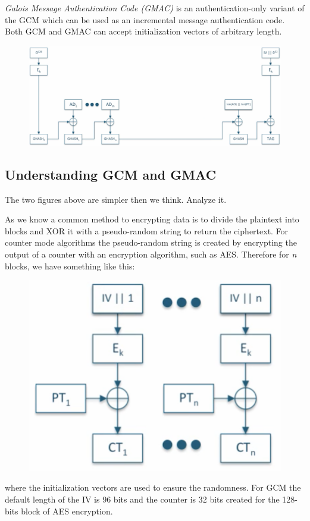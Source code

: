 \documentclass[11pt]{article}
\begin{document}
{\em Galois Message Authentication Code (GMAC)} is an authentication-only variant of the GCM which can be used as an incremental message authentication code. Both GCM and GMAC can accept initialization vectors of arbitrary length.

\begin{figure}[!ht]
  \includegraphics[width=1\textwidth]{pic2-hw3-1635747}
  \label{fig:GMAC}
\end{figure}

\newpage
\subsection{Understanding GCM and GMAC}
The two figures above are simpler then we think. Analyze it.

As we know a common method to encrypting data is to divide the plaintext into blocks and XOR it with a pseudo-random string to return the ciphertext. For counter mode algorithms the pseudo-random string is created by encrypting the output of a counter with an encryption algorithm, such as AES. Therefore for {\em n} blocks, we have something like this:

\begin{figure}[hbt!]
  \centering
  \includegraphics[width=.40\textwidth, height=.2\textheight]{pic3-hw3-1635747}
  \label{fig:Counter Mode}
\end{figure}

where the initialization vectors are used to ensure the randomness. For GCM the default length of the IV is 96 bits and the counter is 32 bits created for the 128-bits block of AES encryption.
\end{document}
